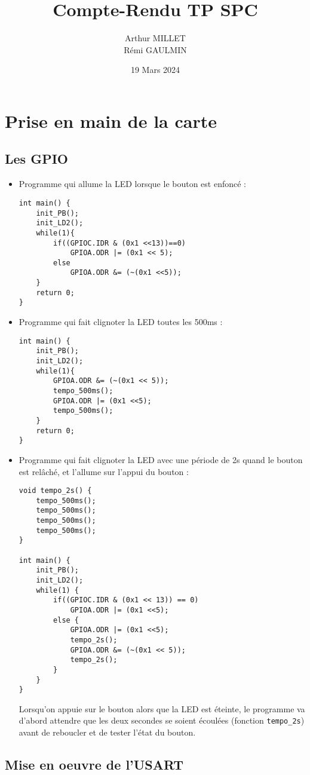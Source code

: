 \documentclass[10pt,a4,french]{article}
\title{Compte-Rendu TP SPC}
\author{Arthur MILLET\\ Rémi GAULMIN}
\date{19 Mars 2024}
\begin{document}
\lstset{language=C, frame=single}

\maketitle

\section{Prise en main de la carte}

\subsection{Les GPIO}

\begin{itemize}
	\item Programme qui allume la LED lorsque le bouton est enfoncé :
		\begin{lstlisting}
int main() {
	init_PB();
	init_LD2();
	while(1){
		if((GPIOC.IDR & (0x1 <<13))==0)
			GPIOA.ODR |= (0x1 << 5);
		else
			GPIOA.ODR &= (~(0x1 <<5));
	}
	return 0;
}
		\end{lstlisting}
	\item Programme qui fait clignoter la LED toutes les 500ms :
		\begin{lstlisting}
int main() {
	init_PB();
	init_LD2();
	while(1){
		GPIOA.ODR &= (~(0x1 << 5));
		tempo_500ms();
		GPIOA.ODR |= (0x1 <<5);
		tempo_500ms();
	}
	return 0;
}
		\end{lstlisting}
	\item Programme qui fait clignoter la LED avec une période de 2s quand le bouton est relâché, et l'allume sur l'appui du bouton :
		\begin{lstlisting}
void tempo_2s() {
	tempo_500ms();
	tempo_500ms();
	tempo_500ms();
	tempo_500ms();
}

int main() {
	init_PB();
	init_LD2();
	while(1) {
		if((GPIOC.IDR & (0x1 << 13)) == 0)
			GPIOA.ODR |= (0x1 <<5);
		else {
			GPIOA.ODR |= (0x1 <<5);
			tempo_2s();
			GPIOA.ODR &= (~(0x1 << 5));
			tempo_2s();
		}
	}
}
		\end{lstlisting}
		Lorsqu'on appuie sur le bouton alors que la LED est éteinte, le programme va d'abord attendre que les deux secondes se soient écoulées (fonction \texttt{tempo\_2s}) avant de reboucler et de tester l'état du bouton.

\end{itemize}

\subsection{Mise en oeuvre de l'USART}
\end{document}
